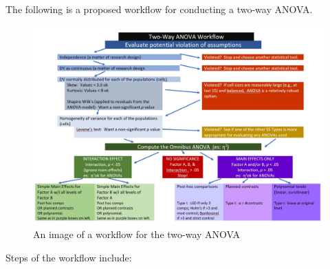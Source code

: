 \documentclass[
  11pt,
]{book}
\begin{document}
The following is a proposed workflow for conducting a two-way ANOVA.

\begin{figure}
\centering
\includegraphics{images/factorial/TwoWayWrkFlo.jpg}
\caption{An image of a workflow for the two-way ANOVA}
\end{figure}

Steps of the workflow include:
\end{document}
